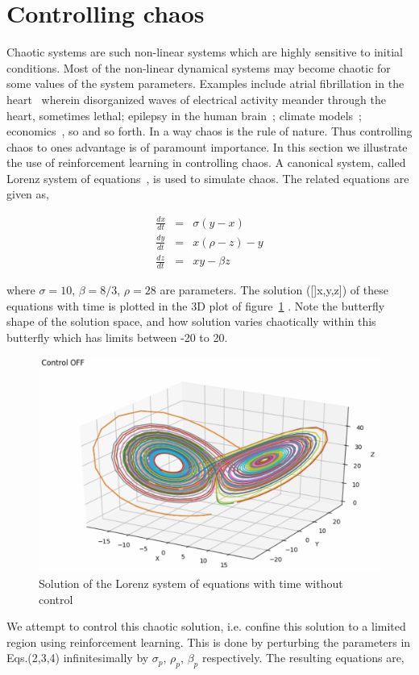 \documentclass[aps, pre, reprint]{revtex4-1}
\newcommand{\bea}{\begin{eqnarray}}
\newcommand{\eea}{\end{eqnarray}}
\begin{document}
\section{Controlling chaos}
\label{sec:chaos}
Chaotic systems are such non-linear systems which are highly sensitive to initial conditions. Most of the non-linear dynamical systems may become chaotic for some values of the system parameters. Examples include atrial fibrillation in the heart~\cite{garfinkel1997quasiperiodicity} wherein disorganized waves of electrical activity meander through the heart, sometimes lethal; epilepsy in the human brain~\cite{babloyantz1986low}; climate models~\cite{shukla1998predictability}; economics~\cite{vlad2010chaos}, so and so forth. In a way chaos is the rule of nature. Thus controlling chaos to ones advantage is of paramount importance. In this section we illustrate the use of reinforcement learning in controlling chaos. A canonical system, called Lorenz system of equations~\cite{lorenz1995essence}, is used to simulate chaos. The related equations are given as,

\bea
\frac{dx}{dt}&=&\sigma(y-x) \\
\frac{dy}{dt}&=&x(\rho - z) - y \\
\frac{dz}{dt}&=&xy - \beta z
\eea

where $\sigma=10$, $\beta=8/3$, $\rho=28$ are parameters. The solution ([]x,y,z]) of these equations with time is plotted in the 3D plot of figure~\ref{fig:off_control} . Note the butterfly shape of the solution space, and how solution varies chaotically within this butterfly which has limits between -20 to 20.

\begin{figure}[ht!]
\includegraphics[scale=0.15]{OFF.png}
\caption{Solution of the Lorenz system of equations with time without control}
\label{fig:off_control} 
\end{figure}
We attempt to control this chaotic solution, i.e. confine this solution to a limited region using reinforcement learning. This is done by perturbing the parameters in Eqs.(2,3,4) infinitesimally by $\sigma_p$, $\rho_p$, $\beta_p$ respectively. The resulting equations are,
\end{document}
